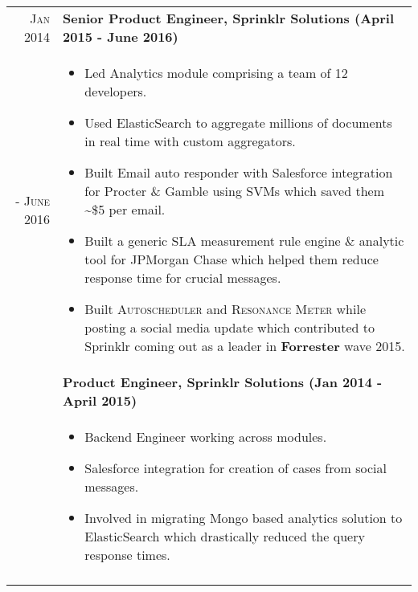 \documentclass[a4paper,10pt]{article}
\begin{document}
\begin{tabular}{r|p{16cm}}
 \textsc{Jan 2014 } & \textbf{Senior Product Engineer, Sprinklr Solutions (April 2015 - June 2016)} \\\textsc{- June 2016}&
 \begin{itemize}[noitemsep]
 \item Led Analytics module comprising a team of 12 developers.
 \item Used ElasticSearch to aggregate millions of documents in real time with custom aggregators.
 \item Built Email auto responder with Salesforce integration for Procter \& Gamble using SVMs which saved them \textasciitilde\$5 per email.
 \item Built a generic SLA measurement rule engine \& analytic tool for JPMorgan Chase which helped them reduce response time for crucial messages.
 \item Built \textsc{Autoscheduler} and \textsc{Resonance Meter} while posting a social media update which contributed to Sprinklr coming out as a leader in \textbf{Forrester} wave 2015.
 \end{itemize}
 \\&
 \textbf{Product Engineer, Sprinklr Solutions (Jan 2014 - April 2015)} \\&
 \begin{itemize}[noitemsep]
 \item Backend Engineer working across modules.
 \item Salesforce integration for creation of cases from social messages.
 \item Involved in migrating Mongo based analytics solution to ElasticSearch which drastically reduced the query response times.
 \end{itemize}
 \\\multicolumn{2}{c}{} \\
\end{tabular}


\end{document}
